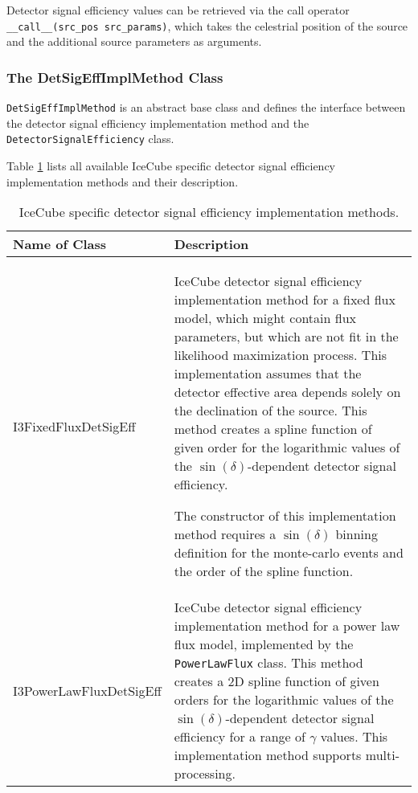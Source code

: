\documentclass{article}
\newcommand{\code}[1]{\texttt{#1}}
\newcommand{\class}[1]{\colorbox{blue!30}{\code{#1}}}
\begin{document}
Detector signal efficiency values can be retrieved via the call operator
\code{\_\_call\_\_(src\_pos src\_params)}, which takes the celestrial position
of the source and the additional source parameters as arguments.

\subsubsection{The DetSigEffImplMethod Class}

\class{DetSigEffImplMethod} is an abstract base class and defines the interface
between the detector signal efficiency implementation method and the
\class{DetectorSignalEfficiency} class.

Table \ref{tbl:I3DetSigEffImplMethod} lists all available IceCube specific
detector signal efficiency implementation methods and their description.
\begin{table}
\caption{IceCube specific detector signal efficiency implementation methods.}
\label{tbl:I3DetSigEffImplMethod}

\begin{tabular}{l | p{10cm}}
\hline
Name of Class & Description \\
\hline
I3FixedFluxDetSigEff & IceCube detector signal efficiency implementation method for a
    fixed flux model, which might contain flux parameters, but which
    are not fit in the likelihood maximization process.
    This implementation assumes that the detector effective
    area depends solely on the declination of the source. This method creates
    a spline function of given order for the logarithmic values of the
    $\sin(\delta)$-dependent detector signal efficiency.

    The constructor of this implementation method requires a $\sin(\delta)$
    binning definition for the monte-carlo events and the order of the spline
    function.\\
I3PowerLawFluxDetSigEff & IceCube detector signal efficiency implementation method for a
    power law flux model, implemented by the \class{PowerLawFlux} class.
    This method creates a 2D spline function of given orders for the logarithmic
    values of the $\sin(\delta)$-dependent detector signal efficiency for a
    range of $\gamma$ values. This implementation method supports
    multi-processing.
\end{tabular}
\end{table}
\end{document}
